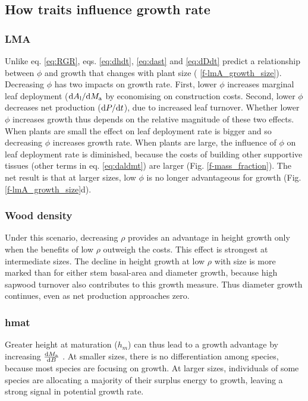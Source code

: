 \documentclass[12pt, a4paper]{article}
\begin{document}
\subsection{How traits influence growth rate}

\subsubsection{LMA}

Unlike eq. \ref{eq:RGR}, eqs. \ref{eq:dhdt}, \ref{eq:dast} and
\ref{eq:dDdt} predict a relationship between $\phi$ and growth that
changes with plant size ( \ref{f-lmA_growth_size}).
Decreasing $\phi$ has two impacts on growth rate. First, lower
$\phi$ increases marginal leaf deployment
(${\rm d}A_{\rm l} / {\rm d}M_{\rm a}$ by economising on
construction costs. Second, lower $\phi$ decreases net production
(${\rm d}P / {\rm d}t$), due to increased leaf turnover. Whether
lower $\phi$ increases growth thus depends on the relative magnitude
of these two effects. When plants are small the effect on leaf
deployment rate is bigger and so decreasing $\phi$ increases growth
rate. When plants are large, the influence of $\phi$ on leaf
deployment rate is diminished, because the costs of building other
supportive tissues (other terms in eq. \ref{eq:daldmt}) are larger (Fig.
\ref{f-mass_fraction}). The net result is that at larger sizes, low
$\phi$ is no longer advantageous for growth (Fig.
\ref{f-lmA_growth_size}d).

\subsubsection{Wood density}

Under this scenario, decreasing $\rho$ provides an advantage in height
growth only when the benefits of low $\rho$ outweigh the costs. This
effect is strongest at intermediate sizes. The decline in height growth
at low $\rho$ with size is more marked than for either stem basal-area
and diameter growth, because high sapwood turnover also contributes to
this growth measure. Thus diameter growth continues, even as net
production approaches zero.

\subsubsection{hmat}

 Greater height at maturation ($h_m$)
can thus lead to a growth advantage by increasing
$\frac{{\rm d}M_{\rm a}}{{\rm d}B}$ . At smaller sizes, there is no differentiation
among species, because most species are focusing on growth. At larger sizes, individuals of some species are
allocating a majority of their surplus energy to growth, leaving a
strong signal in potential growth rate.
\end{document}
